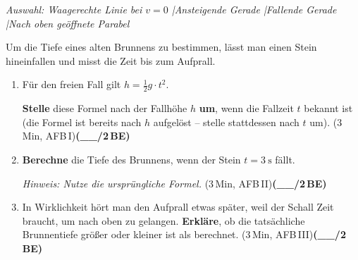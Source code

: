 \documentclass[11pt,a4paper]{article}
\newcommand{\BEZEIT}[3]{%
\hfill{\small\color{zeitgray}(#1\,Min, AFB\,#2)}\quad\textbf{(\_\_/#3\,BE)}%
}
\begin{document}
\vspace{0.5cm}

\textit{Auswahl: Waagerechte Linie bei $v=0$ \quad|\quad Ansteigende Gerade \quad|\quad Fallende Gerade \quad|\quad Nach oben geöffnete Parabel}

\vspace{1cm}


\noindent{}

\vspace{0.4cm}

Um die Tiefe eines alten Brunnens zu bestimmen, lässt man einen Stein hineinfallen und misst die Zeit bis zum Aufprall.

\vspace{0.3cm}

\begin{enumerate}
\item[a)] Für den freien Fall gilt $h = \frac{1}{2}g \cdot t^2$.

\textbf{Stelle} diese Formel nach der Fallhöhe $h$ \textbf{um}, wenn die Fallzeit $t$ bekannt ist (die Formel ist bereits nach $h$ aufgelöst -- stelle stattdessen nach $t$ um). \BEZEIT{3}{I}{2}

\vspace{4cm}

\item[b)] \textbf{Berechne} die Tiefe des Brunnens, wenn der Stein $t = \SI{3}{\second}$ fällt.

\textit{Hinweis: Nutze die ursprüngliche Formel.} \BEZEIT{3}{II}{2}

\vspace{4.5cm}

\item[c)] In Wirklichkeit hört man den Aufprall etwas später, weil der Schall Zeit braucht, um nach oben zu gelangen. \textbf{Erkläre}, ob die tatsächliche Brunnentiefe größer oder kleiner ist als berechnet. \BEZEIT{3}{III}{2}

\vspace{3.5cm}

\end{enumerate}
\end{document}
